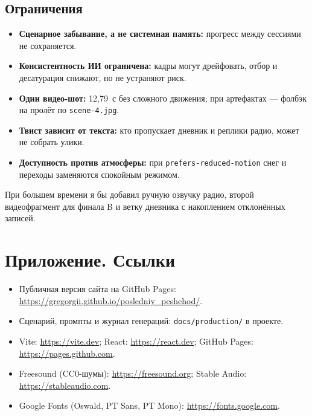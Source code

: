 \documentclass[12pt, a4paper]{article}
\begin{document}
\subsection{Ограничения}
\begin{itemize}
\setlength{\itemsep}{1pt}
    \item \textbf{Сценарное забывание, а не системная память:} прогресс между сессиями не сохраняется.
    \item \textbf{Консистентность ИИ ограничена:} кадры могут дрейфовать, отбор и десатурация снижают, но не устраняют риск.
    \item \textbf{Один видео-шот:} 12{,}79~с без сложного движения; при артефактах --- фолбэк на пролёт по \texttt{scene-4.jpg}.
    \item \textbf{Твист зависит от текста:} кто пропускает дневник и реплики радио, может не собрать улики.
    \item \textbf{Доступность против атмосферы:} при \texttt{prefers-reduced-motion} снег и переходы заменяются спокойным режимом.
\end{itemize}

При большем времени я бы добавил ручную озвучку радио, второй видеофрагмент для финала B и ветку дневника с накоплением отклонённых записей.

\section{Приложение. Ссылки}

\begin{itemize}
\setlength{\itemsep}{3pt}
    \item Публичная версия сайта на GitHub Pages: \url{https://gregorgii.github.io/posledniy_peshehod/}.
    \item Сценарий, промпты и журнал генераций: \texttt{docs/production/} в проекте.
    \item Vite: \url{https://vite.dev}; React: \url{https://react.dev}; GitHub Pages: \url{https://pages.github.com}.
    \item Freesound (CC0-шумы): \url{https://freesound.org}; Stable Audio: \url{https://stableaudio.com}.
    \item Google Fonts (Oswald, PT Sans, PT Mono): \url{https://fonts.google.com}.
\end{itemize}
\end{document}
